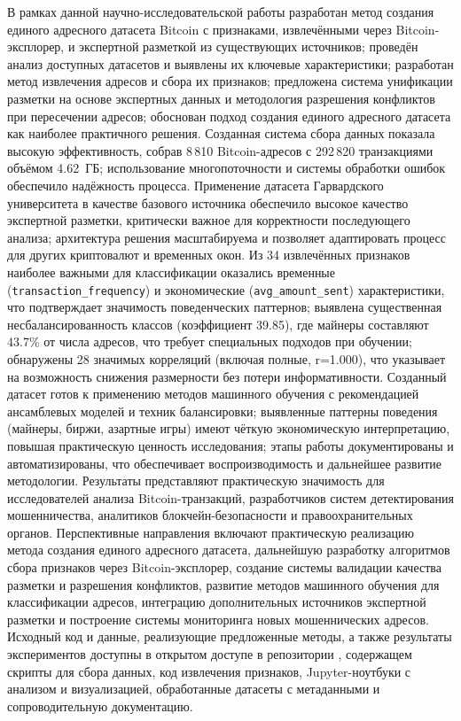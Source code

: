 \conclusion
\begingroup{}\sloppy
В рамках данной научно-исследовательской работы разработан метод создания единого адресного датасета Bitcoin с признаками, извлечёнными через Bitcoin-эксплорер, и экспертной разметкой из существующих источников; проведён анализ доступных датасетов и выявлены их ключевые характеристики; разработан метод извлечения адресов и сбора их признаков; предложена система унификации разметки на основе экспертных данных и методология разрешения конфликтов при пересечении адресов; обоснован подход создания единого адресного датасета как наиболее практичного решения. Созданная система сбора данных показала высокую эффективность, собрав 8\,810 Bitcoin-адресов с 292\,820 транзакциями объёмом 4.62~ГБ; использование многопоточности и системы обработки ошибок обеспечило надёжность процесса. Применение датасета Гарвардского университета в качестве базового источника обеспечило высокое качество экспертной разметки, критически важное для корректности последующего анализа; архитектура решения масштабируема и позволяет адаптировать процесс для других криптовалют и временных окон. Из 34 извлечённых признаков наиболее важными для классификации оказались временные (\texttt{transaction\_frequency}) и экономические (\texttt{avg\_amount\_sent}) характеристики, что подтверждает значимость поведенческих паттернов; выявлена существенная несбалансированность классов (коэффициент 39.85), где майнеры составляют 43.7\% от числа адресов, что требует специальных подходов при обучении; обнаружены 28 значимых корреляций (включая полные, r=1.000), что указывает на возможность снижения размерности без потери информативности. Созданный датасет готов к применению методов машинного обучения с рекомендацией ансамблевых моделей и техник балансировки; выявленные паттерны поведения (майнеры, биржи, азартные игры) имеют чёткую экономическую интерпретацию, повышая практическую ценность исследования; этапы работы документированы и автоматизированы, что обеспечивает воспроизводимость и дальнейшее развитие методологии. Результаты представляют практическую значимость для исследователей анализа Bitcoin-транзакций, разработчиков систем детектирования мошенничества, аналитиков блокчейн-безопасности и правоохранительных органов. Перспективные направления включают практическую реализацию метода создания единого адресного датасета, дальнейшую разработку алгоритмов сбора признаков через Bitcoin-эксплорер, создание системы валидации качества разметки и разрешения конфликтов, развитие методов машинного обучения для классификации адресов, интеграцию дополнительных источников экспертной разметки и построение системы мониторинга новых мошеннических адресов. Исходный код и данные, реализующие предложенные методы, а также результаты экспериментов доступны в открытом доступе в репозитории \cite{github_repo}, содержащем скрипты для сбора данных, код извлечения признаков, Jupyter-ноутбуки с анализом и визуализацией, обработанные датасеты с метаданными и сопроводительную документацию.
\par\endgroup
